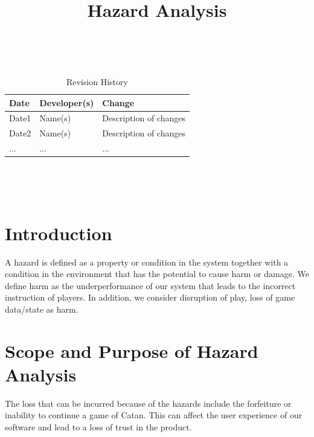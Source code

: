 \documentclass{article}
\title{Hazard Analysis\\\progname}
\author{\authname}
\date{}
\begin{document}
\maketitle
\thispagestyle{empty}

~\newpage


\begin{table}[hp]
\caption{Revision History} \label{TblRevisionHistory}
\begin{tabularx}{\textwidth}{llX}
\toprule
\textbf{Date} & \textbf{Developer(s)} & \textbf{Change}\\
\midrule
Date1 & Name(s) & Description of changes\\
Date2 & Name(s) & Description of changes\\
... & ... & ...\\
\bottomrule
\end{tabularx}
\end{table}

~\newpage

\tableofcontents

~\newpage



\section{Introduction}


A hazard is defined as a property or condition in the system together
with a condition in the environment that has the potential to cause harm or
damage. We define harm as the underperformance of our system
that leads to the incorrect instruction of players. In addition, we consider
disruption of play, loss of game data/state as harm.


\section{Scope and Purpose of Hazard Analysis}



The loss that can be incurred because of the hazards include the
forfeiture or inability to continue a game of Catan. This can affect the
user experience of our software and lead to a loss of trust in the product.
\end{document}
